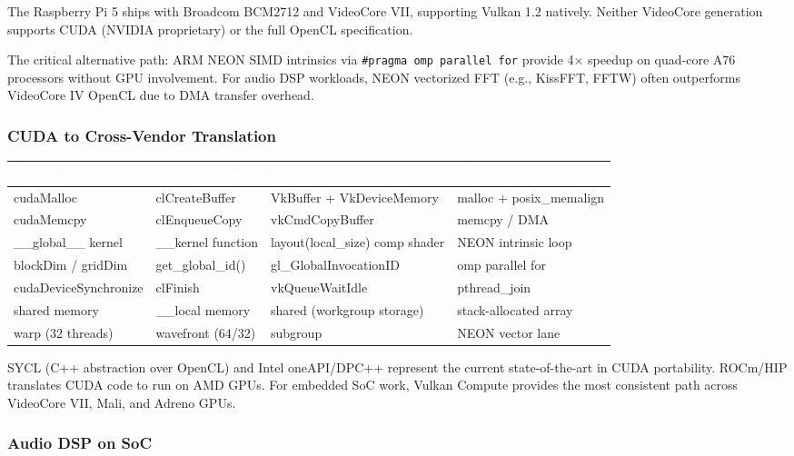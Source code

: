 \documentclass[11pt,letterpaper]{article}
\newcommand{\tableheader}[1]{\textbf{\sffamily\textcolor{white}{#1}}}
\begin{document}
The Raspberry Pi 5 ships with Broadcom BCM2712 and VideoCore VII, supporting Vulkan 1.2 natively. Neither VideoCore generation supports CUDA (NVIDIA proprietary) or the full OpenCL specification.

The critical alternative path: ARM NEON SIMD intrinsics via \texttt{\#pragma omp parallel for} provide 4× speedup on quad-core A76 processors without GPU involvement. For audio DSP workloads, NEON vectorized FFT (e.g., KissFFT, FFTW) often outperforms VideoCore IV OpenCL due to DMA transfer overhead.

\subsubsection{CUDA to Cross-Vendor Translation}

\begin{center}
\begin{tabularx}{\textwidth}{L{3cm}L{3cm}L{3cm}X}
\toprule
{}
\tableheader{CUDA Concept} & \tableheader{OpenCL Equiv.} & \tableheader{Vulkan Compute} & \tableheader{Pi-5 / NEON} \\
\midrule
cudaMalloc & clCreateBuffer & VkBuffer + VkDeviceMemory & malloc + posix\_memalign \\
cudaMemcpy & clEnqueueCopy & vkCmdCopyBuffer & memcpy / DMA \\
\_\_global\_\_ kernel & \_\_kernel function & layout(local\_size) comp shader & NEON intrinsic loop \\
blockDim / gridDim & get\_global\_id() & gl\_GlobalInvocationID & omp parallel for \\
cudaDeviceSynchronize & clFinish & vkQueueWaitIdle & pthread\_join \\
shared memory & \_\_local memory & shared (workgroup storage) & stack-allocated array \\
warp (32 threads) & wavefront (64/32) & subgroup & NEON vector lane \\
\bottomrule
\end{tabularx}
\end{center}

SYCL (C++ abstraction over OpenCL) and Intel oneAPI/DPC++ represent the current state-of-the-art in CUDA portability. ROCm/HIP translates CUDA code to run on AMD GPUs. For embedded SoC work, Vulkan Compute provides the most consistent path across VideoCore VII, Mali, and Adreno GPUs.

\subsubsection{Audio DSP on SoC}
\end{document}
